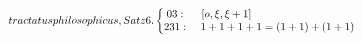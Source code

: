 \documentclass {minimal}
\begin{document}
\[ tractatusphilosophicus,Satz6.
\left\{ 
\begin {matrix}
03 : &  { [o,\xi, \xi+1] \kern 8.2cm } \\ 
231 : & { \ 1+1+1+1=(1+1)+(1+1) \kern 5cm}
\end {matrix}
\right.
\]
\end{document}
